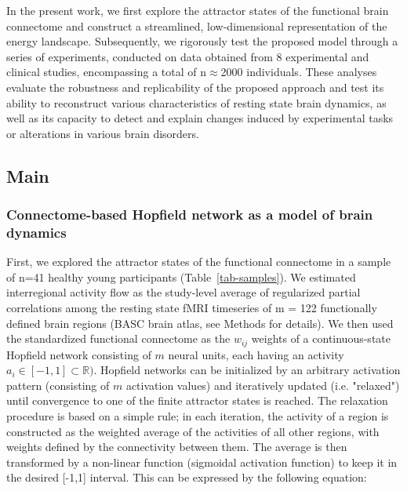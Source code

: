 \documentclass{article}
\begin{document}
In the present work, we first explore the attractor states of the functional brain connectome and construct a streamlined, low-dimensional representation of the energy landscape.
Subsequently, we rigorously test the proposed model through a series of experiments, conducted on data obtained
from 8 experimental and clinical studies, encompassing a total of n$\approx$2000 individuals.
These analyses evaluate the robustness and replicability of the proposed approach and test its ability to reconstruct various characteristics of resting state brain dynamics, as well as its capacity to detect and explain changes induced by experimental tasks or alterations in various brain disorders.

\subsection{Main}\label{Main}

\subsubsection{Connectome-based Hopfield network as a model of brain dynamics}\label{Connectome-based Hopfield network as a model of brain dynamics}

First, we explored the attractor states of the functional connectome in a sample of n=41 healthy young
participants (Table~\ref{tab-samples}). We estimated interregional activity flow \citep{cole2016activity, ito2017cognitive}
as the study-level average of regularized partial correlations among the resting state fMRI timeseries of m = 122
functionally defined brain regions (BASC brain atlas, see Methods for details). We then used the standardized
functional connectome as the $w_{ij}$  weights of a continuous-state Hopfield network
\citep{hopfield1982neural, koiran1994dynamics} consisting of $m$ neural units, each having an activity
$a_i \in [ -1,1] \subset \mathbb{R})$. Hopfield networks can be initialized by an arbitrary activation pattern (consisting of
$m$ activation values) and iteratively updated (i.e. "relaxed") until convergence to one of the finite attractor states is reached. The relaxation procedure is based on a simple rule; in each iteration, the activity of a region is constructed as the weighted average of the activities of all other regions, with weights defined by the connectivity between them. The average is then transformed by a non-linear function (sigmoidal activation function) to keep it in the desired [-1,1] interval.
This can be expressed by the following equation:
\end{document}
